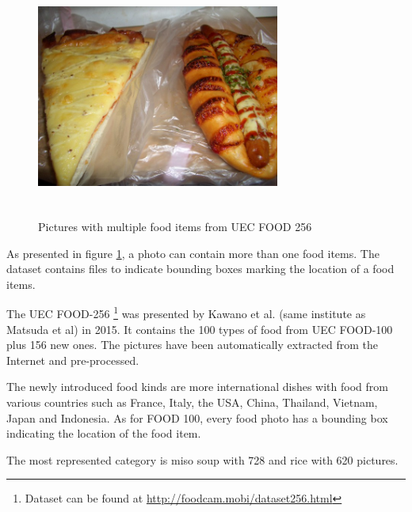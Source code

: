 \begin{figure}[h]
    \includegraphics[width=8cm, height=8cm]{img/multiple_food_items_4}
    \caption{Pictures with multiple food items from UEC FOOD 256}
    \label{fig:presentation_multiple_food_items}
\end{figure}

As presented in figure \ref{fig:presentation_multiple_food_items}, a photo can contain more than one food items. The dataset contains files to indicate bounding boxes marking the location of a food items.

The UEC FOOD-256 \footnote{Dataset can be found at \url{http://foodcam.mobi/dataset256.html}} was presented by Kawano et al. (same institute as Matsuda et al) in 2015. It contains the 100 types of food from UEC FOOD-100 plus 156 new ones. The pictures have been automatically extracted from the Internet and pre-processed. 

The newly introduced food kinds are more international dishes with food from various countries such as France, Italy, the USA, China, Thailand, Vietnam, Japan and Indonesia. As for FOOD 100, every food photo has a bounding box indicating the location of the food item.

The most represented category is miso soup with 728 and rice with 620 pictures.